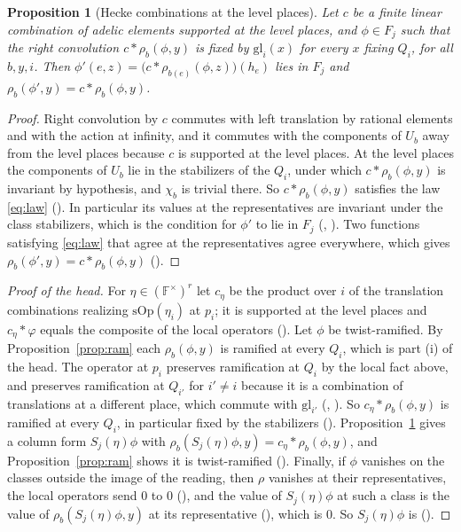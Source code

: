 \documentclass[11pt]{article}
\newcommand{\Fq}{\mathbb F}
\newcommand{\rT}{\rho}
\newtheorem{proposition}[theorem]{Proposition}
\theoremstyle{definition}
\theoremstyle{remark}
\begin{document}
\begin{proposition}[Hecke combinations at the level places]\label{prop:hecke}
Let $c$ be a finite linear combination of adelic elements supported at the level places, and $\phi\in F_j$ such that the right convolution $c*\rT_b(\phi,y)$ is fixed by $\mathrm{gl}_i(x)$ for every $x$ fixing $Q_i$, for all $b,y,i$. Then $\phi'(e,z)=\big(c*\rT_{b(e)}(\phi,z)\big)(h_e)$ lies in $F_j$ and $\rT_b(\phi',y)=c*\rT_b(\phi,y)$.
\end{proposition}

\begin{proof}
Right convolution by $c$ commutes with left translation by rational elements and with the action at infinity, and it commutes with the components of $U_b$ away from the level places because $c$ is supported at the level places. At the level places the components of $U_b$ lie in the stabilizers of the $Q_i$, under which $c*\rT_b(\phi,y)$ is invariant by hypothesis, and $\chi_b$ is trivial there. So $c*\rT_b(\phi,y)$ satisfies the law \eqref{eq:law} (). In particular its values at the representatives are invariant under the class stabilizers, which is the condition for $\phi'$ to lie in $F_j$ (, ). Two functions satisfying \eqref{eq:law} that agree at the representatives agree everywhere, which gives $\rT_b(\phi',y)=c*\rT_b(\phi,y)$ ().
\end{proof}

\begin{proof}[Proof of the head]
For $\eta\in(\Fq^\times)^r$ let $c_\eta$ be the product over $i$ of the translation combinations realizing $\mathrm{sOp}(\eta_i)$ at $p_i$; it is supported at the level places and $c_\eta*\varphi$ equals the composite of the local operators (). Let $\phi$ be twist-ramified. By Proposition~\ref{prop:ram} each $\rT_b(\phi,y)$ is ramified at every $Q_i$, which is part (i) of the head. The operator at $p_i$ preserves ramification at $Q_i$ by the local fact above, and preserves ramification at $Q_{i'}$ for $i'\ne i$ because it is a combination of translations at a different place, which commute with $\mathrm{gl}_{i'}$ (, ). So $c_\eta*\rT_b(\phi,y)$ is ramified at every $Q_i$, in particular fixed by the stabilizers (). Proposition~\ref{prop:hecke} gives a column form $S_j(\eta)\phi$ with $\rT_b(S_j(\eta)\phi,y)=c_\eta*\rT_b(\phi,y)$, and Proposition~\ref{prop:ram} shows it is twist-ramified (). Finally, if $\phi$ vanishes on the classes outside the image of the reading, then $\rT$ vanishes at their representatives, the local operators send $0$ to $0$ (), and the value of $S_j(\eta)\phi$ at such a class is the value of $\rT_b(S_j(\eta)\phi,y)$ at its representative (), which is $0$. So $S_j(\eta)\phi$ is  ().
\end{proof}
\end{document}
